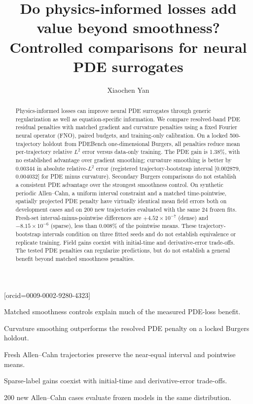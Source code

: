 \documentclass[a4paper,fleqn]{cas-sc}
\begin{document}
\let\WriteBookmarks\relax
\def\floatpagepagefraction{1}
\def\textpagefraction{.001}

\title[mode=title]{Do physics-informed losses add value beyond smoothness? Controlled comparisons for neural PDE surrogates}

\author[1]{Xiaochen Yan}[orcid=0009-0002-9280-4323]
\cormark[1]

\begin{abstract}
Physics-informed losses can improve neural PDE surrogates through generic regularization as well as equation-specific information. We compare resolved-band PDE residual penalties with matched gradient and curvature penalties using a fixed Fourier neural operator (FNO), paired budgets, and training-only calibration. On a locked 500-trajectory holdout from PDEBench one-dimensional Burgers, all penalties reduce mean per-trajectory relative $L^2$ error versus data-only training. The PDE gain is 1.38\%, with no established advantage over gradient smoothing; curvature smoothing is better by 0.00344 in absolute relative-$L^2$ error (registered trajectory-bootstrap interval [0.002879, 0.004032] for PDE minus curvature). Secondary Burgers comparisons do not establish a consistent PDE advantage over the strongest smoothness control. On synthetic periodic Allen--Cahn, a uniform interval constraint and a matched time-pointwise, spatially projected PDE penalty have virtually identical mean field errors both on development cases and on 200 new trajectories evaluated with the same 24 frozen fits. Fresh-set interval-minus-pointwise differences are $+4.52\times10^{-7}$ (dense) and $-8.15\times10^{-6}$ (sparse), less than 0.008\% of the pointwise means. These trajectory-bootstrap intervals condition on three fitted seeds and do not establish equivalence or replicate training. Field gains coexist with initial-time and derivative-error trade-offs. The tested PDE penalties can regularize predictions, but do not establish a general benefit beyond matched smoothness penalties.
\end{abstract}

\begin{highlights}
\item Matched smoothness controls explain much of the measured PDE-loss benefit.
\item Curvature smoothing outperforms the resolved PDE penalty on a locked Burgers holdout.
\item Fresh Allen--Cahn trajectories preserve the near-equal interval and pointwise means.
\item Sparse-label gains coexist with initial-time and derivative-error trade-offs.
\item 200 new Allen--Cahn cases evaluate frozen models in the same distribution.
\end{highlights}
\end{document}
